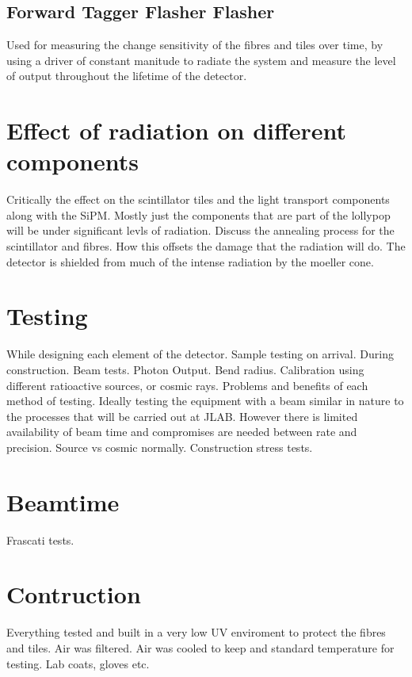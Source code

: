 \subsection{Forward Tagger Flasher Flasher}

Used for measuring the change sensitivity of the fibres and tiles over time, by using a driver of constant manitude to radiate the system and measure the level of output throughout the lifetime of the detector.

\section{Effect of radiation on different components}
Critically the effect on the scintillator tiles and the light transport components along with the SiPM. Mostly just the components that are part of the lollypop will be under significant levls of radiation.
Discuss the annealing process for the scintillator and fibres. How this offsets the damage that the radiation will do.
The detector is shielded from much of the intense radiation by the moeller cone. 

\cite{bross1990radiation}
\cite{barsuk2000radiation}
\cite{protopopov1993radiation}
\section{Testing}
While designing each element of the detector.
Sample testing on arrival.
During construction.
Beam tests.
Photon Output.
Bend radius.
Calibration using different ratioactive sources, or cosmic rays. Problems and benefits of each method of testing.
Ideally testing the equipment with a beam similar in nature to the processes that will be carried out at JLAB. However there is limited availability of beam time and compromises are needed between rate and precision. Source vs cosmic normally.
Construction stress tests.
\section{Beamtime}
Frascati tests.
\section{Contruction}
Everything tested and built in a very low UV enviroment to protect the fibres and tiles.
Air was filtered.
Air was cooled to keep and standard temperature for testing.
Lab coats, gloves etc.


